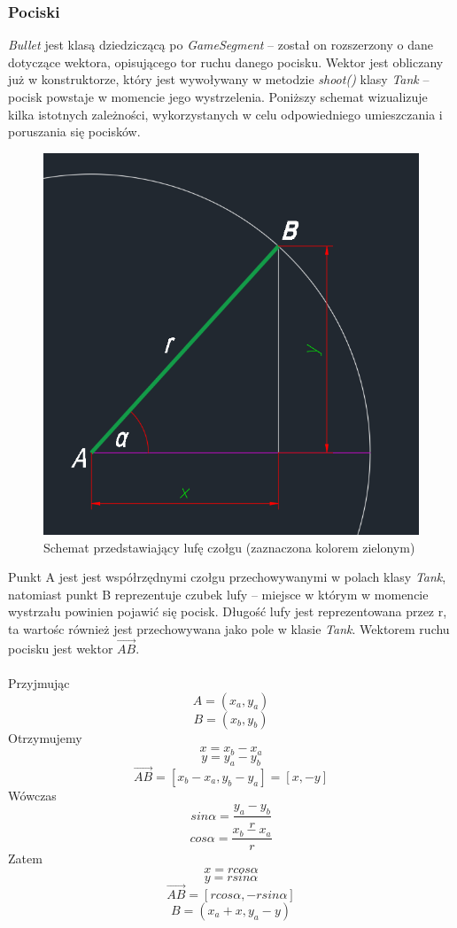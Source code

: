 \documentclass[11pt,a4paper]{report}
\begin{document}
\subsubsection{Pociski}
\textsl{Bullet} jest klasą dziedziczącą po \textsl{GameSegment} -- został on rozszerzony o dane dotyczące wektora, opisującego tor ruchu danego pocisku. Wektor jest obliczany już w konstruktorze, który jest wywoływany w metodzie \textsl{shoot()} klasy \textsl{Tank} -- pocisk powstaje w momencie jego wystrzelenia. Poniższy schemat wizualizuje kilka istotnych zależności, wykorzystanych w celu odpowiedniego umieszczania i poruszania się pocisków.
\begin{figure}[!ht]
\centerline{\includegraphics{img/schemat_lufa.png}}
\caption{Schemat przedstawiający lufę czołgu (zaznaczona kolorem zielonym)}
\end{figure}
Punkt A jest jest współrzędnymi czołgu przechowywanymi w polach klasy \textsl{Tank}, natomiast punkt B reprezentuje czubek lufy -- miejsce w którym w momencie wystrzału powinien pojawić się pocisk. Długość lufy jest reprezentowana przez r, ta wartośc również jest przechowywana jako pole w klasie \textsl{Tank}. Wektorem ruchu pocisku jest wektor $\vec{AB}$.\\\\
Przyjmując \[A = (x_a, y_a)\]\[B = (x_b, y_b)\]
Otrzymujemy \[x = x_b - x_a\]\[y = y_a - y_b\] \[\vec{AB} = [x_b - x_a, y_b - y_a] = [x, -y]\]
Wówczas \[sin\alpha= \frac{y_a - y_b}{r}\] \[cos\alpha = \frac{x_b - x_a}{r}\]
Zatem \[x = rcos\alpha\]\[y = rsin\alpha\]\[\vec{AB} = [rcos\alpha, -rsin\alpha]\]\[B = (x_a + x, y_a - y)\]
\end{document}
